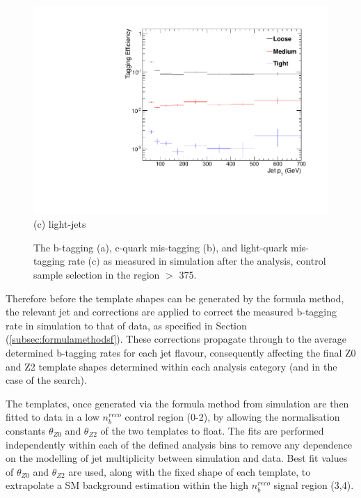 \begin{figure}[ht]
\begin{minipage}[b]{0.48\linewidth}
\includegraphics[width = 1.0\linewidth]{plots/lighjet_PtDistribution_Htbin_Template_375.pdf}
\centering (c) light-jets
\end{minipage}
\caption[The b-tagging (a), c-quark mis-tagging (b), and light-quark mis-tagging rate (c$)$ as measured in simulation after the \alphat analysis, \mupjets control sample selection in the region \theht $>$ 375.]{The b-tagging (a), c-quark mis-tagging (b), and light-quark mis-tagging rate (c$)$ as measured in simulation after the \alphat analysis, \mupjets control sample selection in the region \theht $>$ 375.}
\label{fig:templatetaggingefficiencies}
\end{figure}

Therefore before the template shapes can be generated by the formula method, the relevant jet \pt and \eta corrections are applied to correct the measured b-tagging rate in simulation to that of data, as specified in Section (\ref{subsec:formulamethodsf}). These corrections propagate through to the average determined b-tagging rates for each jet flavour, consequently affecting the final Z0 and Z2 \nbreco template shapes determined within each analysis category (\theht and \njet in the case of the \alphat search). 

The templates, once generated via the formula method from simulation are then fitted to data in a low $n_{b}^{reco}$ control region (0-2), by allowing the normalisation constants $\theta_{Z0}$ and $\theta_{Z2}$ of the two templates to float. The fits are performed independently within each of the defined analysis bins to remove any dependence on the modelling of jet multiplicity between simulation and data. Best fit values of $\theta_{Z0}$ and $\theta_{Z2}$ are used, along with the fixed shape of each template, to extrapolate a \ac{SM} background estimation within the high $n_{b}^{reco}$ signal region (3,4). 

